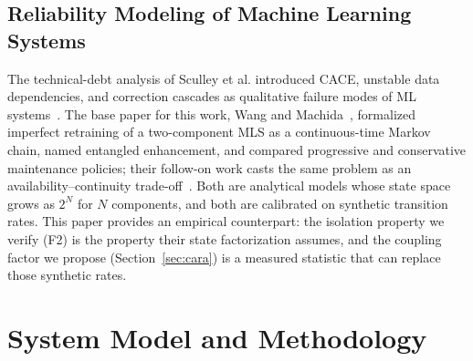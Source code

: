 \documentclass[conference]{IEEEtran}
\begin{document}
\subsection{Reliability Modeling of Machine Learning Systems}
The technical-debt analysis of Sculley et al. introduced CACE, unstable data
dependencies, and correction cascades as qualitative failure modes of ML
systems~\cite{sculley2015hidden}. The base paper for this work, Wang and
Machida~\cite{wang2024compsac}, formalized
imperfect retraining of a two-component MLS as a continuous-time Markov chain,
named entangled enhancement, and compared progressive and conservative
maintenance policies; their follow-on work casts the same problem as an
availability--continuity trade-off~\cite{wang2025issre}. Both are analytical
models whose state space grows as $2^N$ for $N$ components, and both are
calibrated on synthetic transition rates. This paper provides an empirical
counterpart: the isolation property we verify (F2) is the property their state
factorization assumes, and the coupling factor we propose
(Section~\ref{sec:cara}) is a measured statistic that can replace those
synthetic rates.

\section{System Model and Methodology}
\label{sec:method}
\end{document}

